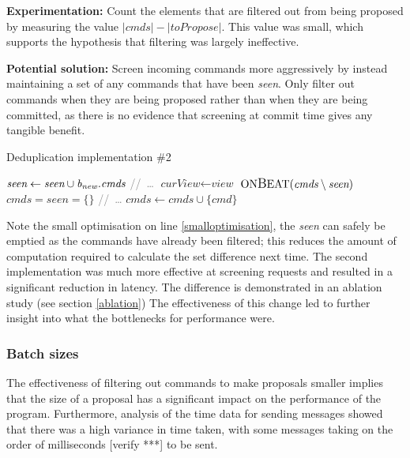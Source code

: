 \textbf{Experimentation: } Count the elements that are filtered out from being proposed by measuring the value $|\textit{cmds}| - |\textit{toPropose}|$. This value was small, which supports the hypothesis that filtering was largely ineffective.

\textbf{Potential solution: } Screen incoming commands more aggressively by instead maintaining a set of any commands that have been \textit{seen}. Only filter out commands when they are being proposed rather than when they are being committed, as there is no evidence that screening at commit time gives any tangible benefit.

\begin{algorithm}[h!]
	\caption{Deduplication implementation \#2} \label{dedup2}
	\begin{algorithmic}[1]
			\State $ \textit{seen} \gets \textit{seen} \cup \textit{b\textsubscript{new}.cmds}$
			\State \textcolor{gray}{//\ \dots}
		\EndIf
	\EndProcedure
		\State $ \textit{curView} \gets \textit{view}$
		\State $ \text{ON{\large B}EAT}(\textit{cmds} \setminus \textit{seen})$
		\State $ \textit{cmds} = \textit{seen} = \{\}$ \label{smalloptimisation}
		\State \textcolor{gray}{//\ \dots}
	\EndProcedure
		\State $ \textit{cmds} \gets \textit{cmds} \cup \{\textit{cmd}\} $
	\EndProcedure
	\end{algorithmic}
\end{algorithm}

Note the small optimisation on line \ref{smalloptimisation}, the \textit{seen} can safely be emptied as the commands have already been filtered; this reduces the amount of computation required to calculate the set difference next time. The second implementation was much more effective at screening requests and resulted in a significant reduction in latency. The difference is demonstrated in an ablation study (see section \ref{ablation}) The effectiveness of this change led to further insight into what the bottlenecks for performance were.

\subsubsection{Batch sizes} \label{batchsizes}
The effectiveness of filtering out commands to make proposals smaller implies that the size of a proposal has a significant impact on the performance of the program. Furthermore, analysis of the time data for sending messages showed that there was a high variance in time taken, with some messages taking on the order of milliseconds [verify ***] to be sent.

